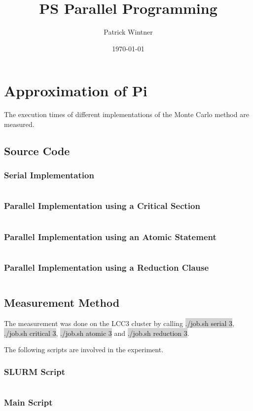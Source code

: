\documentclass[parskip]{scrartcl}
\title{PS Parallel Programming}
\author{Patrick Wintner}
\date{\today}
\begin{document}
	\maketitle
	
	\section{Approximation of Pi}
	The execution times of different implementations of the Monte Carlo method are measured.
	\subsection{Source Code}
	\subsubsection{Serial Implementation}
	\inputminted	[linenos]{c}{ex1/serial.c}
	\subsubsection{Parallel Implementation using a Critical Section}
	\inputminted	[linenos]{c}{ex1/critical.c}
	\subsubsection{Parallel Implementation using an Atomic Statement}
	\inputminted	[linenos]{c}{ex1/atomic.c}
	\subsubsection{Parallel Implementation using a Reduction Clause}
	\inputminted	[linenos]{c}{ex1/reduction.c}
	\subsection{Measurement Method}
	The measurement was done on the LCC3 cluster by calling \colorbox{lightgray}{./job.sh serial 3}, \colorbox{lightgray}{./job.sh critical 3}, \colorbox{lightgray}{./job.sh atomic 3} and \colorbox{lightgray}{./job.sh reduction 3}.
	
	The following scripts are involved in the experiment.
	\subsubsection{SLURM Script}
	\inputminted[linenos]{bash}{ex1/job.sh}
	\subsubsection{Main Script}
	\inputminted[linenos]{bash}{ex1/main.sh}
	
\end{document}
